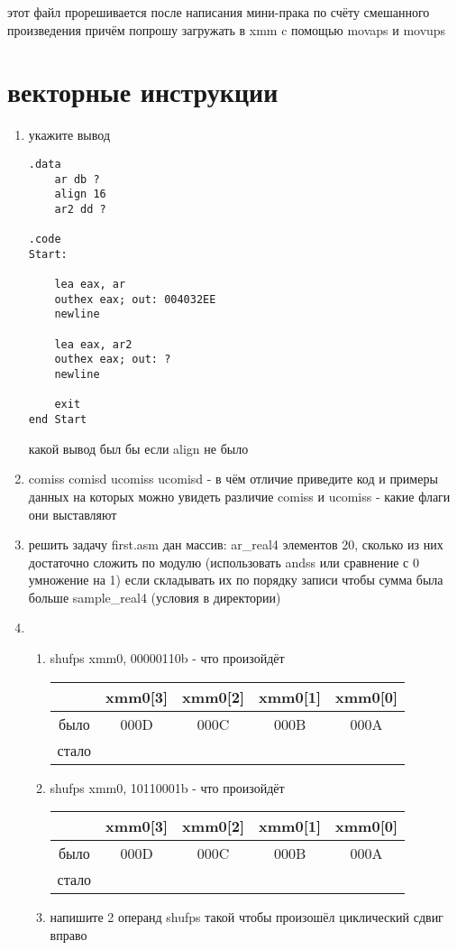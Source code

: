 \documentclass[a4paper,10pt]{article}
\begin{document}
этот файл прорешивается после написания мини-прака по счёту смешанного произведения причём попрошу загружать в xmm c помощью movaps и movups
\section*{векторные инструкции}
\begin{enumerate}
    \item укажите вывод
\begin{verbatim}
.data
    ar db ?
    align 16
    ar2 dd ?

.code
Start:
    
    lea eax, ar
    outhex eax; out: 004032EE
    newline

    lea eax, ar2 
    outhex eax; out: ?
    newline

    exit
end Start
\end{verbatim}
какой вывод был бы если align не было
    \item comiss comisd ucomiss ucomisd - в чём отличие приведите код и примеры данных на которых можно увидеть различие comiss и ucomiss - какие флаги они выставляют
    \item решить задачу first.asm дан массив: ar\_real4 элементов 20, сколько из них достаточно сложить по модулю (использовать andss или сравнение с 0 умножение на 1) если складывать их по порядку записи чтобы сумма была больше sample\_real4 (условия в директории)
    \item 
    \begin{enumerate}
        \item shufps xmm0, 00000110b - что произойдёт \\
        \begin{tabular}{|c|c|c|c|c|}
            \hline
             & xmm0[3] & xmm0[2] & xmm0[1] & xmm0[0] \\
             \hline
            было &  000D & 000C & 000B & 000A \\
            \hline
            стало &   &  &  &   \\
            \hline
        \end{tabular}
        \item shufps xmm0, 10110001b - что произойдёт \\
        \begin{tabular}{|c|c|c|c|c|}
            \hline
             & xmm0[3] & xmm0[2] & xmm0[1] & xmm0[0] \\
             \hline
            было &  000D & 000C & 000B & 000A \\
            \hline
            стало &   &  &  &   \\
            \hline
        \end{tabular}
        \item напишите 2 операнд shufps такой чтобы произошёл циклический сдвиг вправо
    \end{enumerate}


\end{enumerate}
\end{document}
